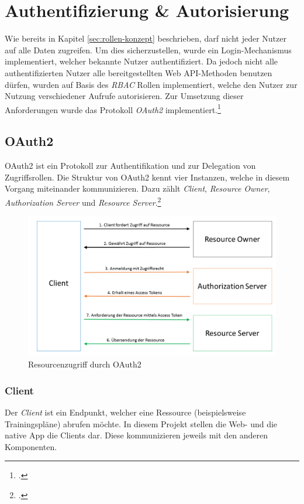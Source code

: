 \section{Authentifizierung \& Autorisierung}
\label{sec:server-authorisierung}
Wie bereits in Kapitel \ref{sec:rollen-konzept} beschrieben, darf nicht jeder Nutzer auf alle Daten zugreifen. Um dies sicherzustellen, wurde ein Login-Mechanismus implementiert, welcher bekannte Nutzer authentifiziert. Da jedoch nicht alle authentifizierten Nutzer alle bereitgestellten Web \ac{API}-Methoden benutzen dürfen, wurden auf Basis des \textit{\ac{RBAC}} Rollen implementiert, welche den Nutzer zur Nutzung verschiedener Aufrufe autorisieren. Zur Umsetzung dieser Anforderungen wurde das Protokoll \textit{OAuth2} implementiert.\footcite{online:WebApi_Authorize}
\subsection{OAuth2}
\label{ssec:oauth2}
OAuth2 ist ein Protokoll zur Authentifikation und zur Delegation von Zugriffsrollen. Die Struktur von OAuth2 kennt vier Instanzen, welche in diesem Vorgang miteinander kommunizieren. Dazu zählt \textit{Client}, \textit{Resource Owner}, \textit{Authorization Server} und \textit{Resource Server}.\footcite[S. 286]{book:AngularJs:Steyer2015} 
\begin{figure}[h]
\centering
\includegraphics[width=1\linewidth]{content/images/OAuth2}
\caption{Resourcenzugriff durch OAuth2}
\label{pic:OAuth2}
\end{figure}
\subsubsection*{Client}
Der \textit{Client} ist ein Endpunkt, welcher eine Ressource (beispielsweise Trainingspläne) abrufen möchte. In diesem Projekt stellen die Web- und die native App die Clients dar. Diese kommunizieren jeweils mit den anderen Komponenten.
